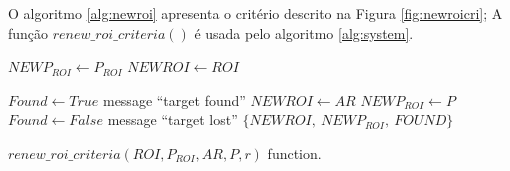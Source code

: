 O algoritmo \ref{alg:newroi} apresenta o critério descrito na Figura \ref{fig:newroicri};
A função $renew\_roi\_criteria()$ é usada pelo algoritmo \ref{alg:system}.
\begin{algorithm}

    $NEWP_{ROI} \leftarrow  P_{ROI}$ \;
    $NEWROI \leftarrow  ROI$ \;
    
    {
      $Found \leftarrow True$\;
        message ``target found''\;
        {
            $NEWROI \leftarrow  AR$\;
            $NEWP_{ROI} \leftarrow  P$\;
        }
    }
    {
      $Found \leftarrow False$\;
      message ``target lost''\;
    }
\Return  $\{NEWROI,~NEWP_{ROI},~FOUND\}$\;
\label{alg:newroi}
\caption{$renew\_roi\_criteria(ROI,P_{ROI},AR,P,r)$ function.}
\end{algorithm}
